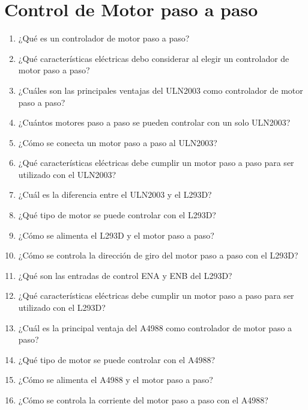 \documentclass[../main]{subfiles}
\begin{document}
\chapter{Control de Motor paso a paso}



\begin{enumerate}
    \item ¿Qué es un controlador de motor paso a paso?
    \item ¿Qué características eléctricas debo considerar al elegir un controlador de motor paso a paso?
    \item ¿Cuáles son las principales ventajas del ULN2003 como controlador de motor paso a paso?
    \item ¿Cuántos motores paso a paso se pueden controlar con un solo ULN2003?
    \item ¿Cómo se conecta un motor paso a paso al ULN2003?
    \item ¿Qué características eléctricas debe cumplir un motor paso a paso para ser utilizado con el ULN2003?
    \item ¿Cuál es la diferencia entre el ULN2003 y el L293D?
    \item ¿Qué tipo de motor se puede controlar con el L293D?
    \item ¿Cómo se alimenta el L293D y el motor paso a paso?
    \item ¿Cómo se controla la dirección de giro del motor paso a paso con el L293D?
    \item ¿Qué son las entradas de control ENA y ENB del L293D?
    \item ¿Qué características eléctricas debe cumplir un motor paso a paso para ser utilizado con el L293D?
    \item ¿Cuál es la principal ventaja del A4988 como controlador de motor paso a paso?
    
    \item ¿Qué tipo de motor se puede controlar con el A4988?
    
    \item ¿Cómo se alimenta el A4988 y el motor paso a paso?
    
    \item ¿Cómo se controla la corriente del motor paso a paso con el A4988?
    

\end{enumerate}
\end{document}
